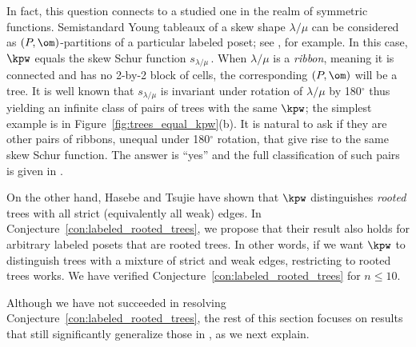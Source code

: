 In fact, this question connects to a studied one in the realm of symmetric functions.  Semistandard Young tableaux of a skew shape $\lambda/\mu$ can be considered as $(P,\om)$-partitions of a particular labeled poset; see \cite[\S7.19]{Sta99}, for example.  In this case, $\kpw$ equals the skew Schur function $s_{\lambda/\mu}$\,.  When $\lambda/\mu$ is a \emph{ribbon}, meaning it is connected and has no 2-by-2 block of cells, the corresponding $(P,\om)$ will be a tree.  It is well known that $s_{\lambda/\mu}$ is invariant under rotation of $\lambda/\mu$ by 180$^\circ$ thus yielding an infinite class of pairs of trees with the same $\kpw$; the simplest example is in Figure~\ref{fig:trees_equal_kpw}(b).  It is natural to ask if they are other pairs of ribbons, unequal under 180$^\circ$ rotation, that give rise to the same skew Schur function. The answer is ``yes'' and the full classification of such pairs is given in \cite{BTvW06}.

On the other hand, Hasebe and Tsujie \cite{HaTs17} have shown that $\kpw$ distinguishes \emph{rooted} trees with all strict (equivalently all weak) edges.  In Conjecture~\ref{con:labeled_rooted_trees}, we propose that their result also holds for arbitrary labeled posets that are rooted trees.  In other words, if we want $\kpw$ to distinguish trees with a mixture of strict and weak edges, restricting to rooted trees works.  We have verified Conjecture~\ref{con:labeled_rooted_trees} for $n\leq 10$.

Although we have not succeeded in resolving Conjecture~\ref{con:labeled_rooted_trees}, the rest of this section focuses on results that still significantly generalize those in \cite{HaTs17}, as we next explain.   

